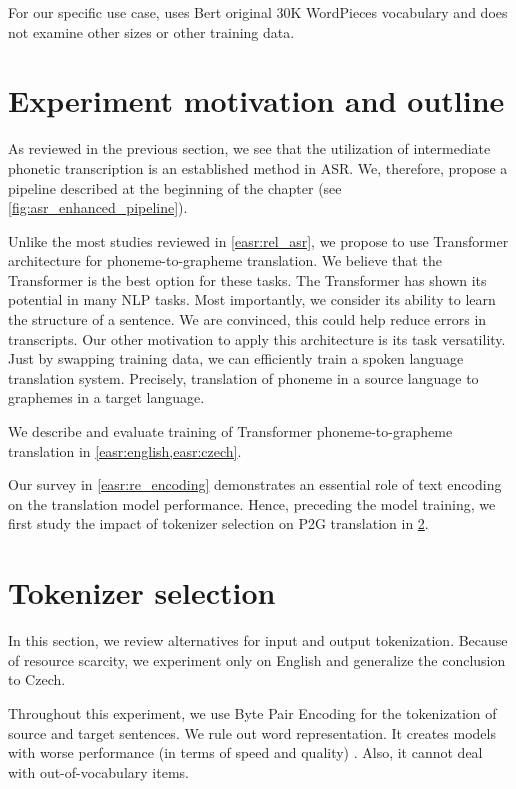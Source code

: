 For our specific use case,  uses Bert  original 30K WordPieces vocabulary and does not examine other sizes or other training data.

\pagebreak
\section{Experiment motivation and outline}
\label{easr:eperiment}
As reviewed in the previous section, we see that the utilization of intermediate phonetic transcription is an established method in ASR. We, therefore, propose a pipeline described at the beginning of the chapter (see \cref{fig:asr_enhanced_pipeline}). 

Unlike the most studies reviewed in \cref{easr:rel_asr}, we propose to use Transformer architecture for phoneme-to-grapheme translation. We believe that the Transformer is the best option for these tasks. The Transformer has shown its potential in many NLP tasks. Most importantly, we consider its ability to learn the structure of a sentence. We are convinced, this could help reduce errors in transcripts. Our other motivation to apply this architecture is its task versatility. Just by swapping training data, we can efficiently train a spoken language translation system. Precisely, translation of phoneme in a source language to graphemes in a target language. 

We describe and evaluate training of Transformer phoneme-to-grapheme translation in \cref{easr:english,easr:czech}.

Our survey in \cref{easr:re_encoding} demonstrates an essential role of text encoding on the translation model performance. Hence, preceding the model training, we first study the impact of tokenizer selection on P2G translation in \cref{easr:tokenizer}.


\section{Tokenizer selection}
\label{easr:tokenizer}

In this section, we review alternatives for input and output tokenization. Because of resource scarcity, we experiment only on English and generalize the conclusion to Czech. 

Throughout this experiment, we use Byte Pair Encoding for the tokenization of source and target sentences. We rule out word representation. It creates models with worse performance (in terms of speed and quality) . Also, it cannot deal with out-of-vocabulary items.

